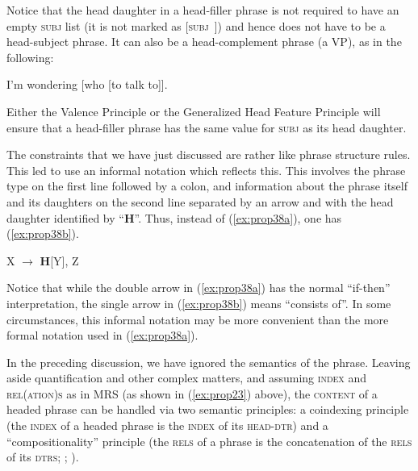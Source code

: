 \documentclass[output=paper
	        ,collection
	        ,collectionchapter
 	        ,biblatex
                ,babelshorthands
                ,newtxmath
                ,draftmode
                ,colorlinks, citecolor=brown
]{langscibook}
\begin{document}
Notice that the head daughter in a head-filler phrase is not required to have an empty \textsc{subj} list (it is not marked as [\textsc{subj}~\eliste]) and hence does not have to be a head-subject phrase. It can also be a head-complement phrase (a VP), as in the following:

\ea\label{ex:prop37}
I’m wondering [who [to talk to]].
\z

\noindent
Either the Valence Principle or the Generalized Head Feature Principle will ensure that a head-filler phrase has the same value for \textsc{subj} as its head daughter.

The constraints that we have just discussed are rather like phrase structure rules. This led \citet[33]{GSag2000a-u} to use an informal notation which reflects this. This involves the phrase type on the first line followed by a colon, and information about the phrase itself and its daughters on the second line separated by an arrow and with the head daughter identified by ``\textbf{H}''. Thus, instead of (\ref{ex:prop38a}), one has (\ref{ex:prop38b}).

\eal\label{ex:prop38}
\ex\label{ex:prop38a}
 \impl
{}
\ex\label{ex:prop38b}
	
X $\to$ \textbf{H}[Y], Z
\zl

\noindent
Notice that while the double arrow in (\ref{ex:prop38a}) has the normal ``if-then'' interpretation, the single arrow in (\ref{ex:prop38b}) means ``consists of''. In some circumstances, this informal notation may be more convenient than the more formal notation used in (\ref{ex:prop38a}).

In the preceding discussion, we have ignored the semantics of the phrase. 
Leaving aside quantification and other complex matters, and assuming \textsc{index} and
\textsc{rel(ation)s} as in MRS (as shown in (\ref{ex:prop23}) above), the \textsc{content} of a headed phrase can be handled via two semantic principles: a coindexing principle (the \textsc{index} of a headed phrase is the
\textsc{index} of its \textsc{head-dtr}) and a ``compositionality'' principle (the \textsc{rels} of
a phrase is the concatenation of the \textsc{rels} of its \textsc{dtrs}; \citealp[Section~4.3.2,
Section~5]{CFPS2005a}; ).
\end{document}
